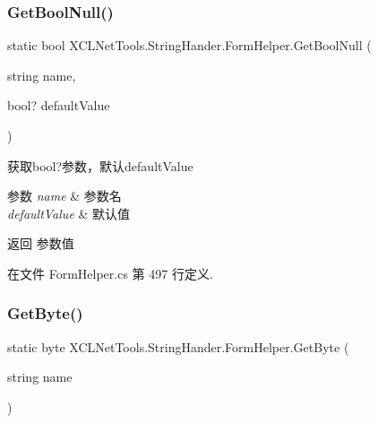 \subsubsection{\texorpdfstring{Get\+Bool\+Null()}{GetBoolNull()}\hspace{0.1cm}{\footnotesize\ttfamily [2/2]}}
{\footnotesize\ttfamily static bool X\+C\+L\+Net\+Tools.\+String\+Hander.\+Form\+Helper.\+Get\+Bool\+Null (\begin{DoxyParamCaption}\item[{string}]{name,  }\item[{bool?}]{default\+Value }\end{DoxyParamCaption})\hspace{0.3cm}{\ttfamily [static]}}



获取bool?参数，默认default\+Value 


\begin{DoxyParams}{参数}
{\em name} & 参数名\\
\hline
{\em default\+Value} & 默认值\\
\hline
\end{DoxyParams}
\begin{DoxyReturn}{返回}
参数值
\end{DoxyReturn}


在文件 Form\+Helper.\+cs 第 497 行定义.

\mbox{\label{class_x_c_l_net_tools_1_1_string_hander_1_1_form_helper_aac299eb0719beba6c618deeed497fd76}} 
\subsubsection{\texorpdfstring{Get\+Byte()}{GetByte()}\hspace{0.1cm}{\footnotesize\ttfamily [1/2]}}
{\footnotesize\ttfamily static byte X\+C\+L\+Net\+Tools.\+String\+Hander.\+Form\+Helper.\+Get\+Byte (\begin{DoxyParamCaption}\item[{string}]{name }\end{DoxyParamCaption})\hspace{0.3cm}{\ttfamily [static]}}



